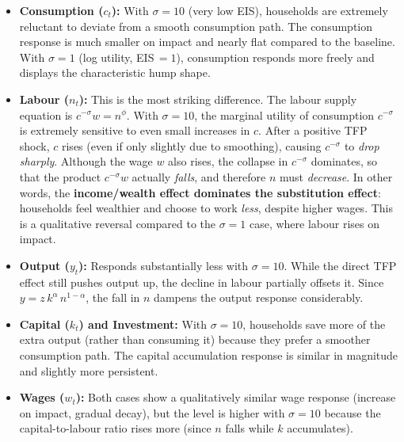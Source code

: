 \documentclass[dvipsnames,11pt]{article}
\begin{document}
\begin{enumerate}
\begin{solution}
                    \begin{itemize}
                        \item \textbf{Consumption ($c_t$):} With $\sigma = 10$ (very low EIS), households are extremely reluctant to deviate from a smooth consumption path.  The consumption response is much smaller on impact and nearly flat compared to the baseline.  With $\sigma=1$ (log utility, EIS$\,=1$), consumption responds more freely and displays the characteristic hump shape.

                        \item \textbf{Labour ($n_t$):}  This is the most striking difference.  The labour supply equation is $c^{-\sigma}w = n^{\phi}$.  With $\sigma=10$, the marginal utility of consumption $c^{-\sigma}$ is extremely sensitive to even small increases in $c$.  After a positive TFP shock, $c$ rises (even if only slightly due to smoothing), causing $c^{-\sigma}$ to \emph{drop sharply}.  Although the wage $w$ also rises, the collapse in $c^{-\sigma}$ dominates, so that the product $c^{-\sigma}w$ actually \emph{falls}, and therefore $n$ must \emph{decrease}.  In other words, the \textbf{income/wealth effect dominates the substitution effect}: households feel wealthier and choose to work \emph{less}, despite higher wages.  This is a qualitative reversal compared to the $\sigma=1$ case, where labour rises on impact.

                        \item \textbf{Output ($y_t$):} Responds substantially less with $\sigma = 10$.  While the direct TFP effect still pushes output up, the decline in labour partially offsets it.  Since $y = z\,k^{\alpha}\,n^{1-\alpha}$, the fall in $n$ dampens the output response considerably.

                        \item \textbf{Capital ($k_t$) and Investment:} With $\sigma = 10$, households save more of the extra output (rather than consuming it) because they prefer a smoother consumption path.  The capital accumulation response is similar in magnitude and slightly more persistent.

                        \item \textbf{Wages ($w_t$):} Both cases show a qualitatively similar wage response (increase on impact, gradual decay), but the level is higher with $\sigma=10$ because the capital-to-labour ratio rises more (since $n$ falls while $k$ accumulates).
                    \end{itemize}


\end{solution}
\end{enumerate}
\end{document}
